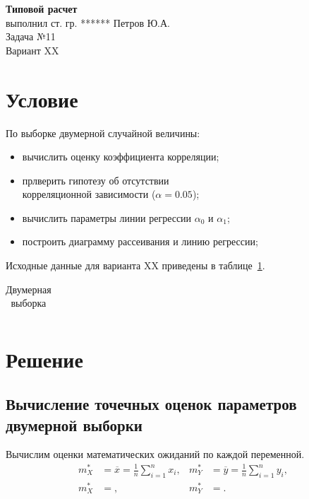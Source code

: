 \documentclass[14pt,hidelinks]{extarticle}
\begin{document}


\begin{center}
	\textbf{Типовой расчет} \\ 
	выполнил ст. гр. ****** Петров Ю.А. \\
        Задача №11\\
	Вариант XX 
\end{center}

\section{Условие}

По выборке двумерной случайной величины:

\begin{itemize}
	\item вычислить оценку коэффициента корреляции;
        \item прлверить гипотезу об отсутствии \\
          корреляционной зависимости ($ \alpha = 0.05 $);
	\item вычислить параметры линии регрессии $ \alpha_0 $ и $ \alpha_1 $; 
	\item построить диаграмму рассеивания и линию регрессии;
\end{itemize}

Исходные данные для варианта XX приведены в таблице~\ref{tbl:second_sample}.

\begin{table}[h!]
  \renewcommand{\tabcolsep}{0.6em} 
	\centering
	\caption{Двумерная выборка\label{tbl:second_sample}}
	\begin{tabular}{llllllllll}
          
	\end{tabular}
\end{table}

\newpage

\section{Решение}

\subsection{Вычисление точечных оценок параметров двумерной выборки}

Вычислим оценки математических ожиданий по каждой переменной.
\begin{align}
  m^*_X &= \overline{x} = \frac{1}{n} \sum_{i=1}^{n} x_i, &
  m^*_Y &= \overline{y} = \frac{1}{n} \sum_{i=1}^{n} y_i, \\ \nonumber
  m^*_X &= , &
  m^*_Y &= .
\end{align}
\end{document}
